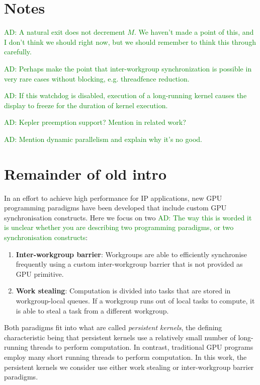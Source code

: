 \documentclass[numbers,nocopyrightspace,10pt]{sigplanconf}
\newcommand{\ADComment}[1]{\textcolor{green}{AD: #1}}
\begin{document}
\section{Notes}

\ADComment{A natural exit does not decrement $M$.  We haven't made a point of this, and I don't think we should right now, but we should remember to think this through carefully.}


  \ADComment{Perhaps
  make the point that inter-workgroup synchronization is possible in
  very rare cases without blocking, e.g. threadfence reduction.}

\ADComment{If this watchdog is disabled,
execution of a long-running kernel causes the display to freeze for
the duration of kernel execution.}

\ADComment{Kepler preemption support?  Mention in related work?}

\ADComment{Mention dynamic parallelism and explain why it's no good.}

\section{Remainder of old intro}

In an effort to achieve high performance for IP applications, new GPU
programming paradigms have been developed that include custom GPU
synchronisation constructs. Here we focus on two \ADComment{The way this is worded it is unclear whether you are describing two programming paradigms, or two synchronisation constructs}:

\begin{enumerate}
\item {\bf Inter-workgroup barrier}: Workgroups are able to
  efficiently synchronise frequently using a custom inter-workgroup
  barrier that is not provided as GPU primitive.

\item {\bf Work stealing}: Computation is divided into tasks that are
  stored in workgroup-local queues. If a workgroup runs out of local
  tasks to compute, it is able to steal a task from a different
  workgroup.
\end{enumerate}

Both paradigms fit into what are called \emph{persistent kernels}, the
defining characteristic being that persistent kernels use a relatively
small number of long-running threads to perform computation. In
contrast, traditional GPU programs employ many short running threads
to perform computation. In this work, the persistent kernels we consider
use either work stealing or inter-workgroup barrier paradigms.
\end{document}
